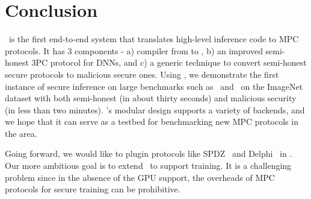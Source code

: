 \section{Conclusion}\label{sec:conclusion}
\cryptflow\ is the first end-to-end system that translates high-level
\tensorflow inference code to MPC protocols. It has 3 components - a) compiler from \tensorflow to \mpc, b) an improved semi-honest 3PC protocol for DNNs, and c) a generic technique to convert semi-honest secure protocols to malicious secure ones.
Using \cryptflow, we demonstrate the first instance of secure inference on large benchmarks such as \resnet\ and \densenet\ on the ImageNet dataset
with both semi-honest (in about thirty seconds) and malicious security (in less than two minutes).
 \cryptflow's modular design supports a variety of backends, and we hope that it can serve as a testbed for benchmarking new MPC protocols in the area. 

Going forward, we would like to plugin protocols like SPDZ~\cite{mpspdz} and Delphi~\cite{delphi} in \cryptflow.
Our more ambitious goal is to extend \cryptflow\ to support
\tensorflow training.
It is a challenging problem since in the absence of the GPU support, the
overheads of MPC protocols for secure training can be prohibitive.
